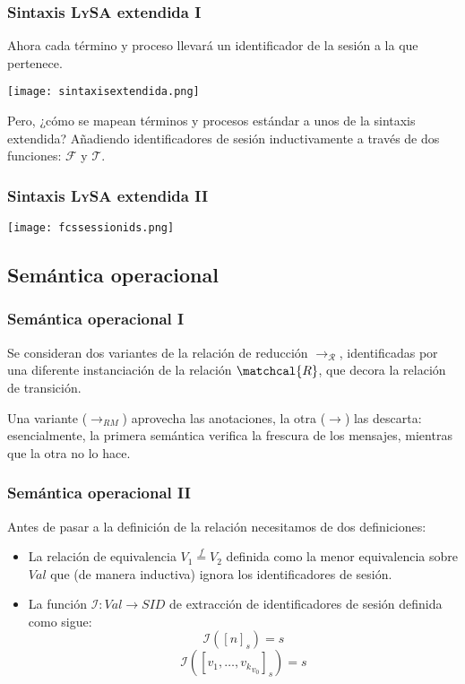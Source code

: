 \documentclass{beamer}
\begin{document}
\begin{frame}
    \frametitle{Sintaxis L\textsc{y}S\textsc{A} extendida I}
    \pause
    Ahora cada término y proceso llevará un identificador de la sesión a la que pertenece. 
    \pause[3]
    \begin{center}
    \texttt{[image: sintaxisextendida.png]}
    \end{center}
    \pause[4]
    Pero, ¿cómo se mapean términos y procesos estándar a unos de la sintaxis extendida? \pause[5]Añadiendo identificadores de sesión inductivamente a través de dos funciones: $\mathcal{F}$ y $\mathcal{T}$.
\end{frame}

\begin{frame}
    \frametitle{Sintaxis L\textsc{y}S\textsc{A} extendida II}
    \pause
    \begin{center}
    \texttt{[image: fcssessionids.png]}
    \end{center}
\end{frame}

\subsection{Semántica operacional}

\begin{frame}
    \frametitle{Semántica operacional I}
    \pause
    Se consideran dos variantes de la relación de reducción $\rightarrow_\mathcal{R}$, identificadas por una diferente instanciación de la relación $\matchcal{R}$, que decora la relación de transición. 
    \pause[3]
    \vspace{0.7cm}
    
    Una variante ($\rightarrow_{RM}$) aprovecha las anotaciones, la otra ($\rightarrow$) las descarta: esencialmente, la primera semántica verifica la frescura de los mensajes, mientras que la otra no lo hace.
\end{frame}

\begin{frame}
    \frametitle{Semántica operacional II}
    \pause
    Antes de pasar a la definición de la relación necesitamos de dos definiciones:
    \pause[3]
    \begin{itemize}
        \item<4-> La relación de equivalencia $V_1 \overset{f}{=} V_2$ definida como la menor equivalencia sobre $Val$ que (de manera inductiva) ignora los identificadores de sesión.
        \item<5-> La función $\mathcal{I}: Val \rightarrow SID$ de extracción de identificadores de sesión definida como sigue:
            $$\mathcal{I}([n]_s) = s$$
            $$\mathcal{I}([{v_1, \dots, v_k}_{v_0}]_s) = s$$
    \end{itemize}
\end{frame}
\end{document}
